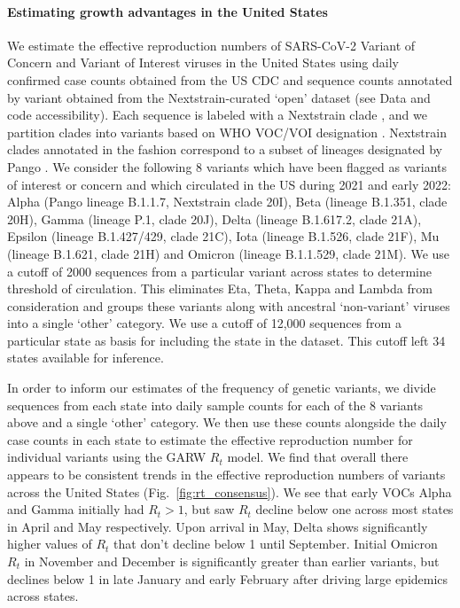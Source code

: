 \documentclass[11pt,oneside,letterpaper]{article}
\begin{document}
\paragraph{Estimating growth advantages in the United States}

We estimate the effective reproduction numbers of SARS-CoV-2 Variant of Concern and Variant of Interest viruses in the United States using daily confirmed case counts obtained from the US CDC and sequence counts annotated by variant obtained from the Nextstrain-curated `open' dataset \cite{Hadfield2018} (see Data and code accessibility).
Each sequence is labeled with a Nextstrain clade \cite{Hadfield2018}, and we partition clades into variants based on WHO VOC/VOI designation \cite{Konings2021}.
Nextstrain clades annotated in the fashion correspond to a subset of lineages designated by Pango \cite{Rambaut2020}.
We consider the following 8 variants which have been flagged as variants of interest or concern and which circulated in the US during 2021 and early 2022: Alpha (Pango lineage B.1.1.7, Nextstrain clade 20I), Beta (lineage B.1.351, clade 20H), Gamma (lineage P.1, clade 20J), Delta (lineage B.1.617.2, clade 21A), Epsilon (lineage B.1.427/429, clade 21C), Iota (lineage B.1.526, clade 21F), Mu (lineage B.1.621, clade 21H) and Omicron (lineage B.1.1.529, clade 21M).
We use a cutoff of 2000 sequences from a particular variant across states to determine threshold of circulation.
This eliminates Eta, Theta, Kappa and Lambda from consideration and groups these variants along with ancestral `non-variant' viruses into a single `other' category.
We use a cutoff of 12,000 sequences from a particular state as basis for including the state in the dataset.
This cutoff left 34 states available for inference.

In order to inform our estimates of the frequency of genetic variants, we divide sequences from each state into daily sample counts for each of the 8 variants above and a single `other' category.
We then use these counts alongside the daily case counts in each state to estimate the effective reproduction number for individual variants using the GARW $R_{t}$ model.
We find that overall there appears to be consistent trends in the effective reproduction numbers of variants across the United States (Fig.\ \ref{fig:rt_consensus}).
We see that early VOCs Alpha and Gamma initially had $R_t>1$, but saw $R_t$ decline below one across most states in April and May respectively.
Upon arrival in May, Delta shows significantly higher values of $R_t$ that don't decline below 1 until September.
Initial Omicron $R_t$ in November and December is significantly greater than earlier variants, but declines below 1 in late January and early February after driving large epidemics across states.
\end{document}

